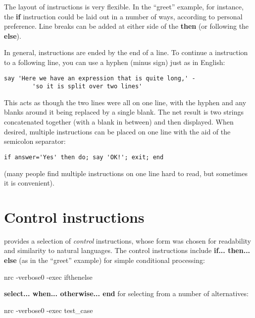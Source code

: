The layout of instructions is very flexible. In the “greet” example,
for instance, the \textbf{if} instruction could be laid out in a number of
ways, according to personal preference. Line breaks can be added at
either side of the \textbf{then} (or following the \textbf{else}).

In general, instructions are ended by the end of a line. To continue a
instruction to a following line, you can use a hyphen (minus sign)
just as in English:
\begin{lstlisting}[label=continue,caption=Continuation]
    say 'Here we have an expression that is quite long,' -
        'so it is split over two lines'
\end{lstlisting}
This acts as though the two lines were all on one line, with the hyphen and any blanks around it being replaced by a single blank. The net result is two strings concatenated together (with a blank in between) and then displayed.
When desired, multiple instructions can be placed on one line with the
aid of the semicolon separator:
\begin{lstlisting}[label=multiple,caption=Multiple Instructions]
    if answer='Yes' then do; say 'OK!'; exit; end
\end{lstlisting}
(many people find multiple instructions on one line hard to read, but sometimes it is convenient).
\section{Control instructions}
\nr{} provides a selection of \emph{control} instructions, whose form was
chosen for readability and similarity to natural languages. The
control instructions include \textbf{if... then... else} (as in the “greet”
example) for simple conditional processing:


\begin{shaded}
\bash[stdout]
nrc -verbose0 -exec ifthenelse
\END
\end{shaded}

\textbf{select... when... otherwise... end} for selecting from a number of
alternatives:


\begin{shaded}
\bash[stdout]
nrc -verbose0 -exec test_case
\END
\end{shaded}

